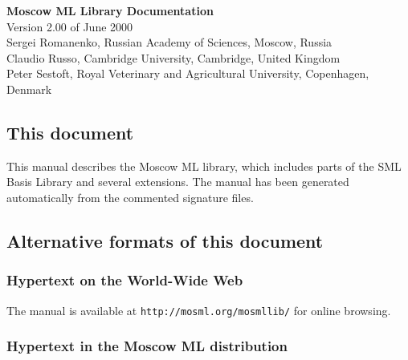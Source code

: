 \documentclass[fleqn,twoside,a4paper]{article}
\begin{document}
\begin{center}

  \vspace*{0cm}

{\huge\bf Moscow ML Library Documentation}\\[0.5cm]

{Version 2.00 of June 2000}\\[0.5cm]

Sergei Romanenko, Russian Academy of Sciences, Moscow, Russia\\
Claudio Russo, Cambridge University, Cambridge, United Kingdom\\
Peter Sestoft, Royal Veterinary and Agricultural University, 
Copenhagen, Denmark

\end{center}

\vspace{1cm}

\subsection*{This document}

This manual describes the Moscow ML library, which includes parts of
the SML Basis Library and several extensions.  The manual has been
generated automatically from the commented signature files.


\subsection*{Alternative formats of this document}

\subsubsection*{Hypertext on the World-Wide Web}
  
The manual is available at
\verb$http://mosml.org/mosmllib/$ for online browsing.


\subsubsection*{Hypertext in the Moscow ML distribution}
  
\end{document}
